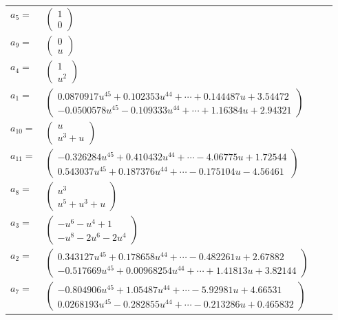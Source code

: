 \documentclass[1p]{elsarticle_modified}
\theoremstyle{definition}
\begin{document}
\begin{tabular}{m{7pt} m{180pt} m{7pt} m{180pt} }
\flushright $a_{5}=$&$\begin{pmatrix}1\\0\end{pmatrix}$ \\
\flushright $a_{9}=$&$\begin{pmatrix}0\\u\end{pmatrix}$ \\
\flushright $a_{4}=$&$\begin{pmatrix}1\\u^2\end{pmatrix}$ \\
\flushright $a_{1}=$&$\begin{pmatrix}0.0870917 u^{45}+0.102353 u^{44}+\cdots+0.144487 u+3.54472\\-0.0500578 u^{45}-0.109333 u^{44}+\cdots+1.16384 u+2.94321\end{pmatrix}$ \\
\flushright $a_{10}=$&$\begin{pmatrix}u\\u^3+u\end{pmatrix}$ \\
\flushright $a_{11}=$&$\begin{pmatrix}-0.326284 u^{45}+0.410432 u^{44}+\cdots-4.06775 u+1.72544\\0.543037 u^{45}+0.187376 u^{44}+\cdots-0.175104 u-4.56461\end{pmatrix}$ \\
\flushright $a_{8}=$&$\begin{pmatrix}u^3\\u^5+u^3+u\end{pmatrix}$ \\
\flushright $a_{3}=$&$\begin{pmatrix}- u^6- u^4+1\\- u^8-2 u^6-2 u^4\end{pmatrix}$ \\
\flushright $a_{2}=$&$\begin{pmatrix}0.343127 u^{45}+0.178658 u^{44}+\cdots-0.482261 u+2.67882\\-0.517669 u^{45}+0.00968254 u^{44}+\cdots+1.41813 u+3.82144\end{pmatrix}$ \\
\flushright $a_{7}=$&$\begin{pmatrix}-0.804906 u^{45}+1.05487 u^{44}+\cdots-5.92981 u+4.66531\\0.0268193 u^{45}-0.282855 u^{44}+\cdots-0.213286 u+0.465832\end{pmatrix}$ \\

\end{tabular}
\end{document}
